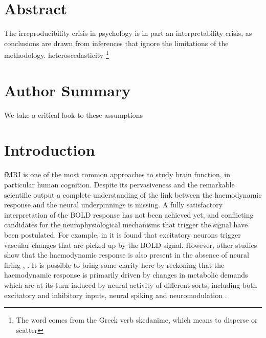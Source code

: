 \documentclass[10pt,letterpaper]{article}
\begin{document}
\section*{Abstract}


The irreproducibility crisis in psychology is in part an interpretability crisis, as conclusions are drawn from inferences that ignore the limitations of the  methodology.
heteroscedasticity \footnote{The word comes from the Greek verb skedanime, which means to disperse or scatter}
\section*{Author Summary}
We take a critical look to these assumptions

\linenumbers


\section*{Introduction}
\label{se:intro}
fMRI is one of the most common approaches to study brain function, in particular human cognition. Despite its pervasiveness and the remarkable scientific output a complete understanding of the link between the haemodynamic response and the neural underpinnings is missing.
A fully satisfactory interpretation of the BOLD response has not been achieved yet, and conflicting candidates for the neurophysiological mechanisms that trigger the signal have been postulated. For example, in \cite{lee2010global} it is found that excitatory neurons trigger vascular changes that are picked up by the BOLD signal. However, other studies show that the haemodynamic response is also present in the absence of neural firing \citep{goense2008neurophysiology}, \citep{sirotin2009anticipatory}. 
It is possible to bring some clarity here by reckoning that the haemodynamic response is primarily driven by changes in metabolic demands which are at its turn induced by neural activity of different sorts, including both excitatory and inhibitory inputs, neural spiking and neuromodulation \citep{logothetis2008we}.  
\end{document}
